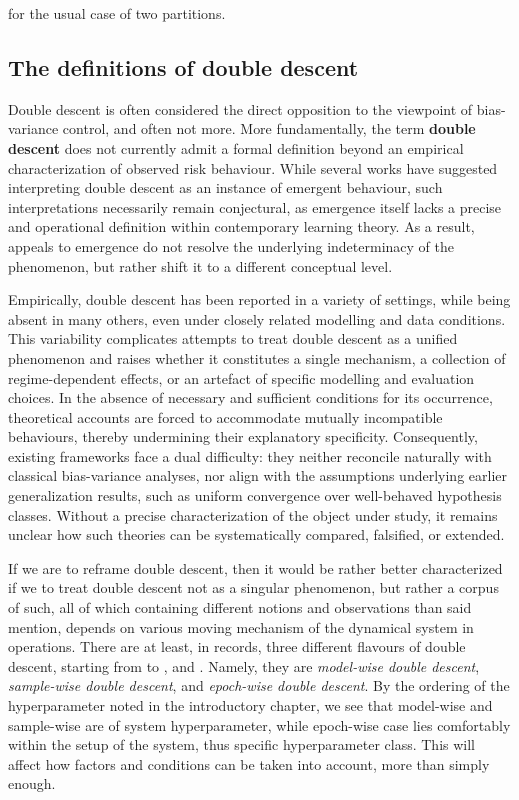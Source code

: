 for the usual case of two partitions. 

\subsection{The definitions of double descent}

Double descent is often considered the direct opposition to the viewpoint of bias-variance control, and often not more. More fundamentally, the term \textbf{double descent} does not currently admit a formal definition beyond an empirical characterization of observed risk behaviour. While several works have suggested interpreting double descent as an instance of emergent behaviour, such interpretations necessarily remain conjectural, as emergence itself lacks a precise and operational definition within contemporary learning theory. As a result, appeals to emergence do not resolve the underlying indeterminacy of the phenomenon, but rather shift it to a different conceptual level.

Empirically, double descent has been reported in a variety of settings, while being absent in many others, even under closely related modelling and data conditions. This variability complicates attempts to treat double descent as a unified phenomenon and raises whether it constitutes a single mechanism, a collection of regime-dependent effects, or an artefact of specific modelling and evaluation choices. In the absence of necessary and sufficient conditions for its occurrence, theoretical accounts are forced to accommodate mutually incompatible behaviours, thereby undermining their explanatory specificity. Consequently, existing frameworks face a dual difficulty: they neither reconcile naturally with classical bias-variance analyses, nor align with the assumptions underlying earlier generalization results, such as uniform convergence over well-behaved hypothesis classes. Without a precise characterization of the object under study, it remains unclear how such theories can be systematically compared, falsified, or extended. 

If we are to reframe double descent, then it would be rather better characterized if we to treat double descent not as a singular phenomenon, but rather a corpus of such, all of which containing different notions and observations than said mention, depends on various moving mechanism of the dynamical system in operations. There are at least, in records, three different flavours of double descent, starting from \cite{belkin_reconciling_2019} to \cite{nakkiran_deep_2019}, and \cite{hastie2019surprises}. Namely, they are \textit{model-wise double descent}, \textit{sample-wise double descent}, and \textit{epoch-wise double descent}. By the ordering of the hyperparameter noted in the introductory chapter, we see that model-wise and sample-wise are of system hyperparameter, while epoch-wise case lies comfortably within the setup of the system, thus specific hyperparameter class. This will affect how factors and conditions can be taken into account, more than simply enough. 

